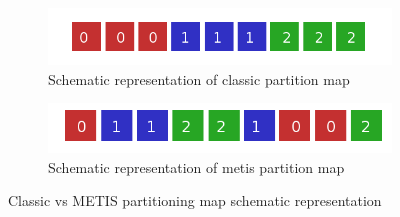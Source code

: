 \documentclass{article}
\begin{document}
\begin{figure}
	\centering
	\begin{subfigure}[b]{0.45\textwidth}
		\includegraphics[width=\textwidth]{rectangles-classic.png}
		\caption{Schematic representation of classic partition map}
		\label{fig:class}
	\end{subfigure}%
	\begin{subfigure}[b]{0.45\textwidth}
		\includegraphics[width=\textwidth]{rectangles-metis.png}
		\caption{Schematic representation of metis partition map}
		\label{fig:metis}
	\end{subfigure}
	\caption{Classic vs METIS partitioning map schematic representation}\label{fig:15}
\end{figure}
\end{document}
